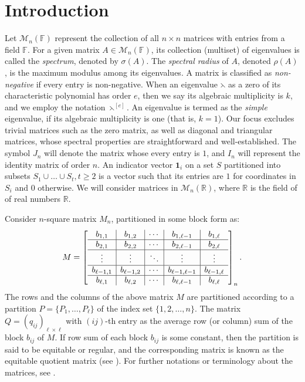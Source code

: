 \documentclass[12pt,twoside]{article}
\begin{document}
\section{Introduction}
Let $\mathcal{M}_n(\mathbb{F})$ represent the collection of all $n \times n$ matrices with entries from a field $\mathbb{F}$. For a given matrix $A \in \mathcal{M}_n(\mathbb{F})$, its collection (multiset) of eigenvalues is called the \emph{spectrum}, denoted by $\sigma(A)$. The \emph{spectral radius} of $A$, denoted $\rho(A)$, is the maximum modulus among its eigenvalues. A matrix is classified as \emph{non-negative} if every entry is non-negative. When an eigenvalue $\leftthreetimes$ as a zero of its characteristic polynomial has order $e$, then we say its algebraic multiplicity is $k$, and we employ the notation $\leftthreetimes^{[e]}$. An eigenvalue is termed as the \emph{simple} eigenvalue, if its algebraic multiplicity is one (that is, $k=1$). Our focus excludes trivial matrices such as the zero matrix, as well as diagonal and triangular matrices, whose spectral properties are straightforward and well-established. The symbol $J_{n}$ will denote the matrix whose every entry is $1$, and $I_{n}$ will represent the identity matrix of order $n.$ An indicator vector $\textbf{1}_{i}$ on a set $S$ partitioned into subsets $S_{1}\cup\dots\cup S_{t},t\geq 2$ is a vector such that its entries are $1$ for coordinates in $S_{i}$ and $0$ otherwise.
We will consider matrices in $\mathcal{M}_n(\mathbb{R}) $, where $\mathbb{R}$ is the field of of real numbers $\mathbb{R}$. 

Consider $n$-square matrix $ M_{n} $, partitioned in some block form as:
\begin{equation*}
	M= \left[ \begin{array}{c | c | c | c | c}
		b_{1,1} & b_{1,2} & \cdots & b_{1,\ell-1} & b_{1,\ell} \\
		\hline
		b_{2,1} & b_{2,2} & \cdots & b_{2,\ell-1}& b_{2,\ell} \\
		\hline
		\vdots & \vdots & \ddots & \vdots & \vdots \\
		\hline
		b_{\ell-1,1} & b_{\ell-1,2} & \cdots & b_{\ell-1,\ell-1} & b_{\ell-1,\ell}\\
		\hline
		b_{\ell,1} & b_{\ell,2} & \cdots & b_{\ell,\ell-1} & b_{\ell,\ell}\\
	\end{array}\right]_{n}. \end{equation*}
The rows and the columns of the above matrix $ M $ are partitioned according to a partition 
$P=\{ P_{1},\dots,P_{\ell}\}$ of the index set $\{1,2,\dots,n\}.$ The matrix $ Q=(q_{ij})_{\ell\times \ell}  $ with $(ij)$-th entry as the average row (or column) sum of the block $ b_{ij} $ of $ M. $ If row sum of each block $b_{ij} $ is some constant, then the partition is said to be equitable or regular, and the corresponding matrix is known as the equitable quotient matrix (see \cite{BH,heamers, cds}). For further notations or terminology about the matrices, see \cite{hj, hjl,vilmar}.
\end{document}

